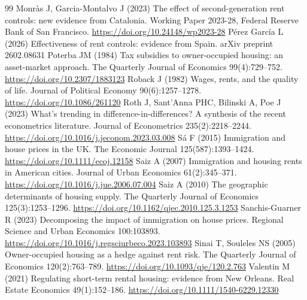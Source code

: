 \begin{thebibliography}{99}
 Monràs J, Garcia-Montalvo J (2023) The effect of second-generation rent controls: new evidence from Catalonia. Working Paper 2023-28, Federal Reserve Bank of San Francisco. \url{https://doi.org/10.24148/wp2023-28}
 Pérez García L (2026) Effectiveness of rent controls: evidence from Spain. arXiv preprint 2602.08631
 Poterba JM (1984) Tax subsidies to owner-occupied housing: an asset-market approach. The Quarterly Journal of Economics 99(4):729--752. \url{https://doi.org/10.2307/1883123}
 Roback J (1982) Wages, rents, and the quality of life. Journal of Political Economy 90(6):1257--1278. \url{https://doi.org/10.1086/261120}
 Roth J, Sant'Anna PHC, Bilinski A, Poe J (2023) What's trending in difference-in-differences? A synthesis of the recent econometrics literature. Journal of Econometrics 235(2):2218--2244. \url{https://doi.org/10.1016/j.jeconom.2023.03.008}
 Sá F (2015) Immigration and house prices in the UK. The Economic Journal 125(587):1393--1424. \url{https://doi.org/10.1111/ecoj.12158}
 Saiz A (2007) Immigration and housing rents in American cities. Journal of Urban Economics 61(2):345--371. \url{https://doi.org/10.1016/j.jue.2006.07.004}
 Saiz A (2010) The geographic determinants of housing supply. The Quarterly Journal of Economics 125(3):1253--1296. \url{https://doi.org/10.1162/qjec.2010.125.3.1253}
 Sanchis-Guarner R (2023) Decomposing the impact of immigration on house prices. Regional Science and Urban Economics 100:103893. \url{https://doi.org/10.1016/j.regsciurbeco.2023.103893}
 Sinai T, Souleles NS (2005) Owner-occupied housing as a hedge against rent risk. The Quarterly Journal of Economics 120(2):763--789. \url{https://doi.org/10.1093/qje/120.2.763}
 Valentin M (2021) Regulating short-term rental housing: evidence from New Orleans. Real Estate Economics 49(1):152--186. \url{https://doi.org/10.1111/1540-6229.12330}
\end{thebibliography}
